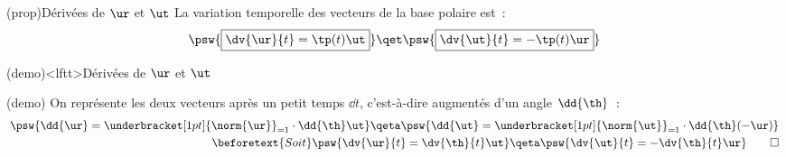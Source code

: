 \documentclass[../../main/main.tex]{subfiles}
\begin{document}
\begin{tcb*}(prop){Dérivées de $\protect\ur$ et $\protect\ut$}
	La variation temporelle des vecteurs de la base polaire est~:
	\[
		\psw{%
			\boxed{\dv{\ur}{t} = \tp(t)\ut}
		}%
		\qet
		\psw{%
			\boxed{\dv{\ut}{t} = -\tp(t)\ur}
		}%
	\]
	\vspace{-15pt}
\end{tcb*}

\begin{tcb}[breakable](demo)<lftt>{Dérivées de $\protect\ur$ et $\protect\ut$}
	\begin{isd}[interior hidden, righthand ratio=.3](demo)
		On représente les deux vecteurs après un petit temps $\dd{t}$, c'est-à-dire
		augmentés d'un angle $\dd{\th}$~:
		\begin{align*}
			\psw{%
				\dd{\ur} = \underbracket[1pt]{\norm{\ur}}_{=1}\cdot \dd{\th} \ut
			}%
			\qeta
			\psw{%
				\dd{\ut} = \underbracket[1pt]{\norm{\ut}}_{=1}\cdot \dd{\th} (-\ur)
			}%
			\\\beforetext{Soit}
			\psw{%
				\dv{\ur}{t} = \dv{\th}{t}\ut
			}%
			\qeta
			\psw{%
				\dv{\ut}{t} = -\dv{\th}{t}\ur
			}%
			\qed
		\end{align*}
		\tcblower
		\begin{center}
\end{center}
\end{isd}
\end{tcb}
\end{document}
